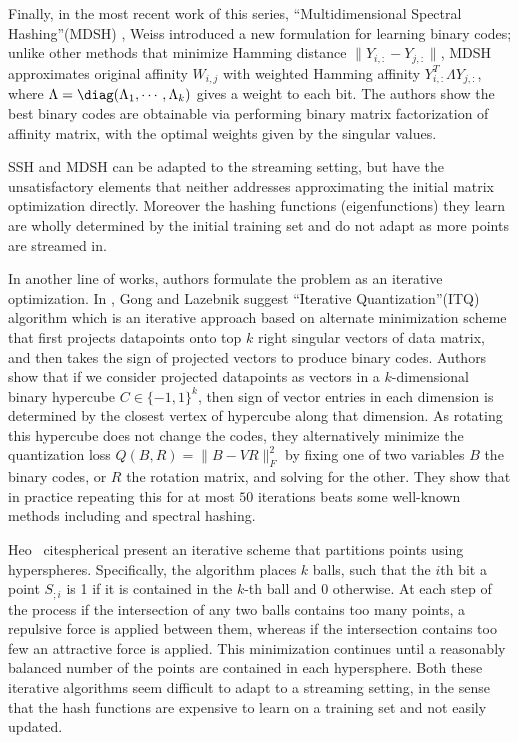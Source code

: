 \documentclass{sig-alternate}
\begin{document}
Finally, in the most recent work of this series, ``Multidimensional Spectral Hashing''(MDSH) \cite{weiss2012multidimensional}, Weiss \etal introduced a new formulation for learning binary codes; unlike other methods that minimize Hamming distance $\|Y_{i,:} - Y_{j,:}\|$, MDSH  approximates original affinity $W_{i,j}$ with weighted Hamming affinity $Y_{i,:}^T \Lambda Y_{j,:}$, where $\Lambda = \diag(\Lambda_1,\cdots,\Lambda_k)$ gives a weight to each bit.
The authors show the best binary codes are obtainable via performing binary matrix factorization of affinity matrix, with the optimal weights given by the singular values. 

SSH and MDSH can be adapted to the streaming setting, but have the unsatisfactory elements that neither addresses approximating the initial matrix optimization directly. Moreover the hashing functions (eigenfunctions) they learn are wholly determined by the initial training set and do not adapt as more points are streamed in.

In another line of works, authors formulate the problem as an iterative optimization. 
In \cite{gong2011iterative}, Gong and Lazebnik suggest ``Iterative Quantization''(ITQ) algorithm which is an iterative approach based on alternate minimization scheme that first projects datapoints onto top $k$ right singular vectors of data matrix, and then takes the sign of projected vectors to produce binary codes. Authors show that if we consider projected datapoints as vectors in a $k$-dimensional binary hypercube $C \in \{-1,1\}^{k}$, then sign of vector entries in each dimension is determined by the closest vertex of hypercube along that dimension. As rotating this hypercube does not change the codes, they alternatively minimize the quantization loss $Q(B,R) = \|B-VR\|_F^2$ by fixing one of two variables $B$ the binary codes, or $R$ the rotation matrix, and solving for the other. They show that in practice repeating this for at most $50$ iterations beats some well-known methods including \cite{fergus2009semi,raginsky2009locality} and spectral hashing\cite{weiss2009spectral}.

Heo \etal ~cite{spherical} present an iterative scheme that partitions points using hyperspheres. Specifically, the algorithm places $k$ balls, such that the $i$th bit a point $S_{;i}$ is 1 if it is contained in the $k$-th ball and $0$ otherwise. At each step of the process if the intersection of any two balls contains too many points, a repulsive force is applied between them, whereas if the intersection contains too few an attractive force is applied. This minimization continues until a reasonably balanced number of the points are contained in each hypersphere.  Both these iterative algorithms seem difficult to adapt to a streaming setting, in the sense that the hash functions are expensive to learn on a training set and not easily updated.
\end{document}
